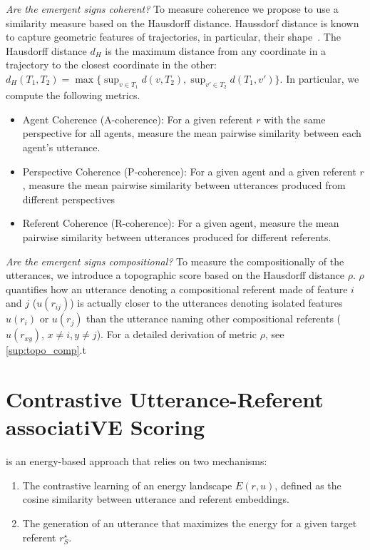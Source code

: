 \textit{Are the emergent signs coherent? } To measure coherence we propose to use a similarity measure based on the Hausdorff distance. Haussdorf distance is known to capture geometric features of trajectories, in particular, their shape~\citep{Besse2015review}. The Hausdorff distance $d_H$ is the maximum distance from any coordinate in a trajectory to the closest coordinate in the other:
$d_H(T_1,T_2) = \max\{\sup_{v \in T_1} d(v,T_2), \sup_{v' \in T_2}d(T_1,v') \}$.
In particular, we compute the following metrics.
\begin{itemize}[noitemsep,topsep=0pt]
    \item Agent Coherence (A-coherence): For a given referent $r$ with the same perspective for all agents, measure the mean pairwise similarity between each agent's utterance.
    \item Perspective Coherence (P-coherence): For a given agent and a given referent $r$, measure the mean pairwise similarity between utterances produced from different perspectives 
    \item Referent Coherence (R-coherence): For a given agent, measure the mean pairwise similarity between utterances produced for different referents.
\end{itemize}

\textit{Are the emergent signs compositional? } To measure the compositionally of the utterances, we introduce a topographic score based on the Hausdorff distance $\rho$. $\rho$ quantifies how an utterance denoting a compositional referent made of feature $i$ and $j$ ($u(r_{ij})$) is actually closer to the utterances denoting isolated features $u(r_i)$ or $u(r_j)$ than the utterance naming other compositional referents ($u(r_{xy})$, $x\neq i, y\neq j$). For a detailed derivation of metric $\rho$, see \ap\ref{sup:topo_comp}.t

\section{Contrastive Utterance-Referent associatiVE Scoring}


\curves is an energy-based approach that relies on two mechanisms:
\begin{enumerate}[noitemsep,topsep=0pt]
\item  The contrastive learning of an energy landscape $E(r,u)$, defined as the cosine similarity between utterance and referent embeddings.
\item The generation of an utterance that maximizes the energy for a given target referent $r^\star_S$.
\end{enumerate}

